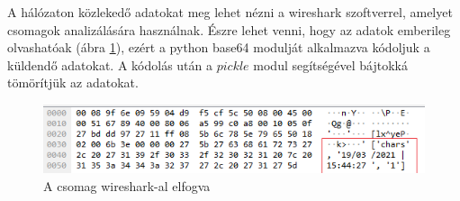 \documentclass[12pt,a4paper,oneside]{report}
\begin{document}
A hálózaton közlekedő adatokat meg lehet nézni a wireshark szoftverrel, amelyet csomagok analizálására használnak. Észre lehet venni, hogy az adatok emberileg olvashatóak (ábra \ref{fig:packetcapture}), ezért a python base64 modulját alkalmazva kódoljuk a küldendő adatokat. A kódolás után a $pickle$ modul segítségével bájtokká tömörítjük az adatokat.
\begin{figure}[H]
\centering
\includegraphics[width=400pt]{../images/wiresharkcapture}
\caption{A csomag wireshark-al elfogva}
\label{fig:packetcapture}
\end{figure}
\end{document}
